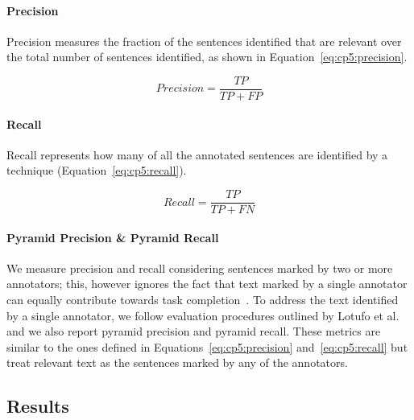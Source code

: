 \paragraph{\textbf{Precision}}

Precision measures the fraction of the sentences identified that are relevant over the total number of sentences identified, as shown in Equation~\ref{eq:cp5:precision}.



\begin{equation}
\label{eq:cp5:precision}    
    Precision = \frac{TP}{TP + FP}
\end{equation}


\paragraph{\textbf{Recall}} Recall represents how many of all the annotated sentences are identified by a technique (Equation~\ref{eq:cp5:recall}).


\begin{equation}
\label{eq:cp5:recall}        
    Recall = \frac{TP}{TP + FN}
\end{equation}



\paragraph{\textbf{Pyramid Precision \& Pyramid Recall}} 

We measure precision and recall considering sentences marked by two or more annotators; this, however ignores the fact that text marked by a single annotator can equally contribute towards task completion~\cite{marques2020}. To address the text identified by a single annotator, we 
follow evaluation procedures outlined by Lotufo et al.~\cite{Lotufo2012} and we
also report pyramid precision and pyramid recall. These metrics are similar to the ones defined in 
Equations~\ref{eq:cp5:precision} and~\ref{eq:cp5:recall} but treat relevant text as the sentences marked by any of the annotators.





\subsection{Results}













